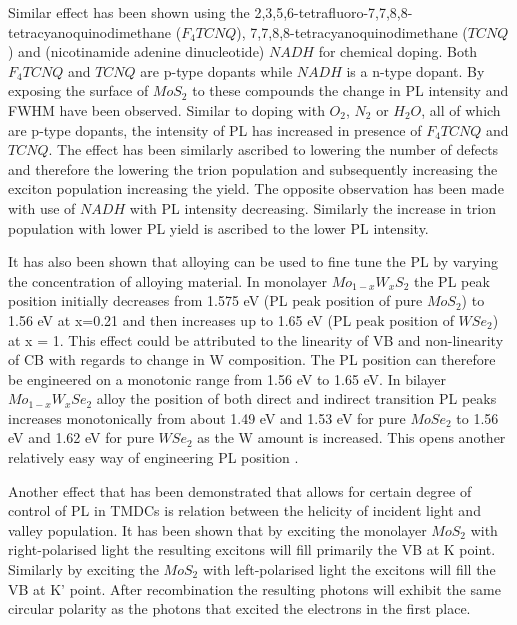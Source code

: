 Similar effect has been shown using the 2,3,5,6-tetrafluoro-7,7,8,8-tetracyanoquinodimethane ($F_4TCNQ$), 7,7,8,8-tetracyanoquinodimethane ($TCNQ$) and (nicotinamide adenine dinucleotide) $NADH$ for chemical doping. Both $F_4TCNQ$ and $TCNQ$ are p-type dopants while $NADH$ is a n-type dopant. By exposing the surface of $MoS_2$ to these compounds the change in PL intensity and FWHM have been observed. Similar to doping with $O_2$, $N_2$ or $H_2O$, all of which are p-type dopants, the intensity of PL has increased in presence of $F_4TCNQ$ and $TCNQ$. The effect has been similarly ascribed to lowering the number of defects and therefore the lowering the trion population and subsequently increasing the exciton population increasing the yield. The opposite observation has been made with use of $NADH$ with PL intensity decreasing. Similarly the increase in trion population with lower PL yield is ascribed to the lower PL intensity. \cite{Mouri2013}
	
It has also been shown that alloying can be used to fine tune the PL by varying the concentration of alloying material. In monolayer $Mo_{1-x}W_xS_2$ the PL peak position initially decreases from 1.575 eV (PL peak position of pure $MoS_2$) to 1.56 eV at x=0.21 and then increases up to 1.65 eV (PL peak position of $WSe_2$) at x = 1. This effect could be attributed to the linearity of VB and non-linearity of CB with regards to change in W composition. The PL position can therefore be engineered on a monotonic range from 1.56 eV to 1.65 eV. In bilayer $Mo_{1-x}W_xSe _2$ alloy the position of both direct and indirect transition PL peaks increases monotonically from about 1.49 eV and 1.53 eV for pure $MoSe_2$ to 1.56 eV and 1.62 eV for pure $WSe_2$ as the W amount is increased. This opens another relatively easy way of engineering PL position \cite{Zhang2014}.
	
Another effect that has been demonstrated that allows for certain degree of control of PL in TMDCs is relation between the helicity of incident light and valley population. It has been shown that by exciting the monolayer $MoS_2$ with right-polarised light the resulting excitons will fill primarily the VB at K point. Similarly by exciting the $MoS_2$ with left-polarised light the excitons will fill the VB at K' point. After recombination the resulting photons will exhibit the same circular polarity as the photons that excited the electrons in the first place. \cite{Mak2012}\cite{Mak2012a}
	
